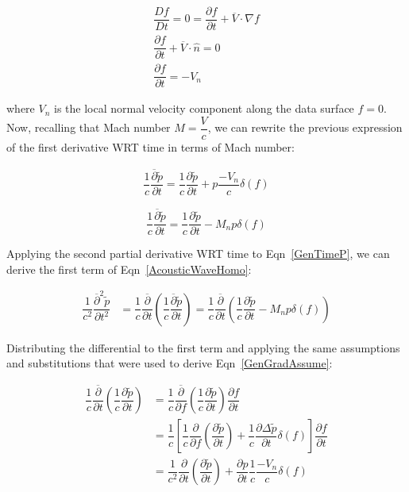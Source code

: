 \documentclass[]{aiaa-tc}%
\begin{document}
\begin{gather*}
\dfrac{Df}{Dt} = 0 = \dfrac{\partial f}{\partial t} + \overline{V} \cdot \nabla f \\
\dfrac{\partial f}{\partial t} + \overline{V} \cdot \hat{n} = 0 \\
\boxed{\dfrac{\partial f}{\partial t} = -V_n}
\end{gather*}

\noindent where $V_n$ is the local normal velocity component along the data surface $f=0$. Now, recalling that Mach number $M = \dfrac{V}{c}$, we can rewrite the previous expression of the first derivative WRT time in terms of Mach number:






\begin{align*}
\dfrac{1}{c}\dfrac{\overline{\partial}\widetilde{p}}{\partial t}
= \dfrac{1}{c}\dfrac{\partial\widetilde{p}}{\partial t}
    + p \dfrac{-V_n}{c} \delta(f)
\end{align*}

\begin{equation} \label{GenTimeP}
\dfrac{1}{c}\dfrac{\overline{\partial}\widetilde{p}}{\partial t}
= \dfrac{1}{c}\dfrac{\partial\widetilde{p}}{\partial t}
    - M_n p\delta(f)
\end{equation}

Applying the second partial derivative WRT time to Eqn~\ref{GenTimeP}, we can derive the first term of Eqn~\ref{AcousticWaveHomo}:

\begin{align*}
\dfrac{1}{c^2}\dfrac{\overline{\partial}^2\widetilde{p}}{\partial t^2}
    &= \dfrac{1}{c}\dfrac{\overline{\partial}}{\partial t} \left(
    \dfrac{1}{c}\dfrac{\overline{\partial}\widetilde{p}}{\partial t} \right)
= \dfrac{1}{c}\dfrac{\overline{\partial}}{\partial t} \left(
\dfrac{1}{c}\dfrac{\partial\widetilde{p}}{\partial t}
    - M_n p\delta(f) \right)
\end{align*}

\noindent Distributing the differential to the first term and applying the same assumptions and substitutions that were used to derive Eqn~\ref{GenGradAssume}:

\begin{align*}
\dfrac{1}{c}\dfrac{\overline{\partial}}{\partial t}
    \left( \dfrac{1}{c}\dfrac{\partial\widetilde{p}}{\partial t} \right)
    &= \dfrac{1}{c}\dfrac{\overline{\partial}}{\partial f}
    \left( \dfrac{1}{c}\dfrac{\partial\widetilde{p}}{\partial t} \right)
    \dfrac{\partial f}{\partial t} \\
&= \dfrac{1}{c} \left[
    \dfrac{1}{c} \dfrac{\partial}{\partial f} \left(
    \dfrac{\partial\widetilde{p}}{\partial t} \right)
    + \dfrac{1}{c} \dfrac{\partial\Delta\widetilde{p}}{\partial t} \delta(f)
    \right] \dfrac{\partial f}{\partial t} \\
&=  \dfrac{1}{c^2} \dfrac{\partial}{\partial t} \left(
    \dfrac{\partial\widetilde{p}}{\partial t} \right)
    + \dfrac{\partial p}{\partial t} \dfrac{1}{c}\dfrac{-V_n}{c} \delta(f)
\end{align*}
\end{document}
